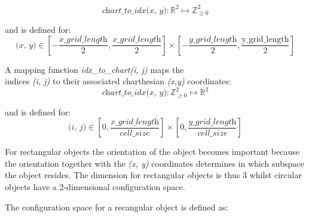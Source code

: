 \[\textit{chart\_to\_idx(x, y)}: \mathbb{R}^2 \mapsto \mathbb{Z}_{\geq 0}^2 \]

and is defined for: 
\[ \textit{(x, y)} \in [-\frac{\textit{x\_grid\_length}}{2}, \frac{\textit{x\_grid\_length}}{2}] \times [-\frac{\textit{y\_grid\_length}}{2}, \frac{\textrm{y\_grid\_length}}{2}]\]

A mapping function \textit{idx\_to\_chart(i, j)} maps the\\indices \textit{(i, j)} to their associated charthesian \textit{(x,y)} coordinates:
\[\textit{chart\_to\_idx(x, y)}: \mathbb{Z}_{\geq 0}^2  \mapsto \mathbb{R}^2 \]

and is defined for:
\[ \textit{(i, j)} \in [0, \frac{\textit{x\_grid\_length}}{\textit{cell\_size}}] \times [0, \frac{\textit{y\_grid\_length}}{\textit{cell\_size}}]\]


For rectangular objects the orientation of the object becomes important because the orientation together with the \textit{(x, y)} coordinates determines in which subspace the object resides. The dimension for rectangular objects is thus 3 whilst circular objects have a 2-dimensional configuration space.\bs

The configuration space for a recangular object is defined as:\bs

